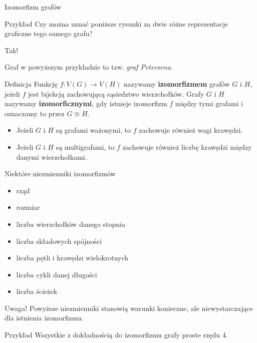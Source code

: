 \documentclass[a4paper,10pt]{beamer}
\begin{document}
\begin{frame}{Izomorfizm grafów}

\begin{exampleblock}{Przykład}
Czy można uznać poniższe rysunki za dwie różne reprezentacje graficzne tego samego grafu?
\begin{center}
	
\end{center}
Tak!
\end{exampleblock}

\medskip

Graf w powyższym przykładzie to tzw. {\it graf Petersena}.

\end{frame}


\begin{frame}
	\begin{block}{Definicja}
		Funkcję $f:V(G)\to V(H)$ nazywamy {\bf izomorfizmem} grafów $G$ i $H$, jeżeli $f$ jest bijekcją zachowującą sąsiedztwo wierzchołków. Grafy $G$ i $H$ nazywamy {\bf izomorficznymi}, gdy istnieje izomorfizm $f$ między tymi grafami i oznaczamy to przez $G\cong H$.
		\begin{itemize}
			\item Jeżeli $G$ i $H$ są grafami ważonymi, to $f$ zachowuje również wagi krawędzi.
			\item Jeżeli $G$ i $H$ są multigrafami, to $f$ zachowuje również liczbę krawędzi między danymi wierzchołkami.
		\end{itemize}
	\end{block}
	
\end{frame}




\begin{frame}

\begin{block}{Niektóre niezmienniki izomorfizmów}
	\begin{itemize}
		\item rząd
		\item rozmiar
		\item liczba wierzchołków danego stopnia
		\item liczba składowych spójności
		\item liczba pętli i krawędzi wielokrotnych
		\item liczba cykli danej długości
		\item liczba ścieżek
	\end{itemize}
\end{block}

\begin{alertblock}{Uwaga!}
	Powyższe niezmienniki stanowią warunki konieczne, ale niewystarczające dla istnienia izomorfizmu.	
\end{alertblock}

\begin{exampleblock}{Przykład}
	Wszystkie z dokładnością do izomorfizmu grafy proste rzędu 4.
\end{exampleblock}

\end{frame}
\end{document}
